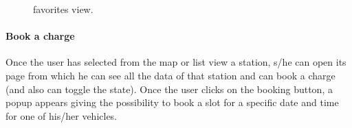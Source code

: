 \begin{figure}[h!]
\begin{minipage}{0.49\textwidth}
        \caption{favorites view.}
    \end{minipage}
\end{figure}

\vfill

\pagebreak

\paragraph{Book a charge} Once the user has selected from the map or list view a station, s/he can open its page from which he can see all the data of that station and can book a charge (and also can toggle the  state). Once the user clicks on the booking button, a popup appears giving the possibility to book a slot for a specific date and time for one of his/her vehicles.

